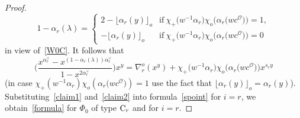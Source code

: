 \documentclass[11pt]{article}
\numberwithin{equation}{section}
\numberwithin{equation}{section}
\begin{document}
\begin{proof}
\begin{equation*}
1-\alpha_r(\lambda)=
\begin{cases}
2-\lfloor\alpha_r(y)\rfloor_o &\text{if}\ \chi_+\bigl(w^{-1}\alpha_r\bigr)\chi_o\bigl(\alpha_r\bigl(wc^\mathcal{O}\bigr)\bigr)=1,\\
-\lfloor\alpha_r(y)\rfloor_o &\text{if}\ \chi_+\bigl(w^{-1}\alpha_r\bigr)\chi_o\bigl(\alpha_r\bigl(wc^\mathcal{O}\bigr)\bigr)=0
\end{cases}
\end{equation*}
in view of~\eqref{W0C}. It follows that
\begin{equation}\label{claim2}
\Biggl(\frac{x^{\alpha_r^\vee}-x^{(1-\alpha_r(\lambda))\alpha_r^\vee}}{1-x^{2\alpha_r^\vee}}\Biggr)x^y=
\nabla_r^o(x^y)+
\chi_+\bigl(w^{-1}\alpha_r\bigr)\chi_o\bigl(\alpha_r\bigl(wc^\mathcal{O}\bigr)\bigr)
x^{s_ry}
\end{equation}
(in case $\chi_+(w^{-1}\alpha_r)\chi_o(\alpha_r\bigl(wc^\mathcal{O}\bigr))=1$ use the fact that $\lfloor\alpha_r(y)\rfloor_o=\alpha_r(y)$).
Substituting~\eqref{claim1} and~\eqref{claim2} into formula~\eqref{spoint} for $i=r$, we obtain~\eqref{formula} for $\Phi_0$ of type ${\rm C}_r$ and for $i=r$.


\end{proof}
\end{document}
